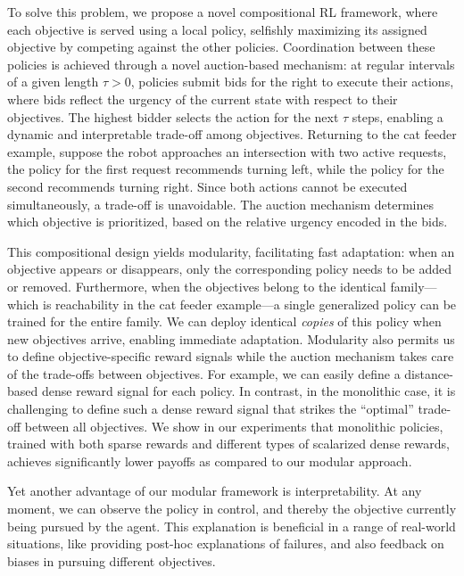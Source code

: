 To solve this problem, we propose a novel compositional RL framework, where each objective is served using a local policy, selfishly maximizing its assigned objective by competing against the other policies.
Coordination between these policies is achieved through a novel auction-based mechanism:
at regular intervals of a given length $\tau>0$, policies submit bids for the right to execute their actions, where bids reflect the urgency of the current state with respect to their objectives. 
The highest bidder selects the action for the next $\tau$ steps, enabling a dynamic and interpretable trade-off among objectives.
Returning to the cat feeder example, suppose the robot approaches an intersection with two active requests, the policy for the first request recommends turning left, while the policy for the second recommends turning right. 
Since both actions cannot be executed simultaneously, a trade-off is unavoidable. 
The auction mechanism determines which objective is prioritized, based on the relative urgency encoded in the bids.

This compositional design yields modularity, facilitating fast adaptation:
when an objective appears or disappears, only the corresponding policy needs to be added or removed.
Furthermore, when the objectives belong to the identical family---which is reachability in the cat feeder example---a single generalized policy can be trained for the entire family. 
We can deploy identical \emph{copies} of this policy when new objectives arrive, enabling immediate adaptation. 
Modularity also permits us to define objective-specific reward signals while the auction mechanism takes care of the trade-offs between objectives.
For example, we can easily define a distance-based dense reward signal for each policy.
In contrast, in the monolithic case, it is challenging to define such a dense reward signal that strikes the ``optimal'' trade-off between all objectives.
We show in our experiments that monolithic policies, trained with both sparse rewards and different types of scalarized dense rewards, achieves significantly lower payoffs as compared to our modular approach.

Yet another advantage of our modular framework is interpretability.
At any moment, we can observe the policy in control, and thereby the objective currently being pursued by the agent. 
This explanation is beneficial in a range of real-world situations, like providing post-hoc explanations of failures, and also feedback on biases in pursuing different objectives.

